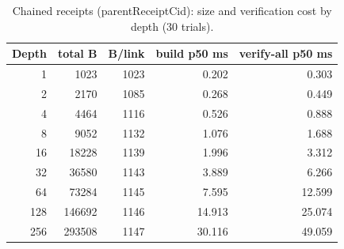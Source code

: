 \begin{table}[t]\centering\caption{Chained receipts (parentReceiptCid): size and verification cost by depth (30 trials).}\label{tab:chain}\scriptsize\begin{tabular}{@{}rrrrr@{}}\toprule Depth & total B & B/link & build p50 ms & verify-all p50 ms\\\midrule
1 & 1023 & 1023 & 0.202 & 0.303\\
2 & 2170 & 1085 & 0.268 & 0.449\\
4 & 4464 & 1116 & 0.526 & 0.888\\
8 & 9052 & 1132 & 1.076 & 1.688\\
16 & 18228 & 1139 & 1.996 & 3.312\\
32 & 36580 & 1143 & 3.889 & 6.266\\
64 & 73284 & 1145 & 7.595 & 12.599\\
128 & 146692 & 1146 & 14.913 & 25.074\\
256 & 293508 & 1147 & 30.116 & 49.059\\
\bottomrule\end{tabular}\end{table}
